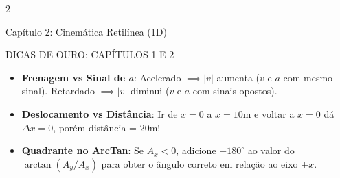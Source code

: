 \documentclass[9pt,a4paper]{article}
\begin{document}
\begin{multicols*}{2}
\begin{topicbox}{Capítulo 2: Cinemática Retilínea (1D)}
\end{topicbox}

\begin{tipbox}{DICAS DE OURO: CAPÍTULOS 1 E 2}
\begin{itemize}[leftmargin=*,itemsep=1pt]
    \item \textbf{Frenagem vs Sinal de $a$}: Acelerado $\implies |v|$ aumenta ($v$ e $a$ com mesmo sinal). Retardado $\implies |v|$ diminui ($v$ e $a$ com sinais opostos).
    \item \textbf{Deslocamento vs Distância}: Ir de $x=0$ a $x=10$m e voltar a $x=0$ dá $\Delta x = 0$, porém distância = $20$m!
    \item \textbf{Quadrante no ArcTan}: Se $A_x < 0$, adicione $+180^\circ$ ao valor do $\arctan(A_y/A_x)$ para obter o ângulo correto em relação ao eixo $+x$.
\end{itemize}
\end{tipbox}

\end{multicols*}

\newpage %
\end{document}
